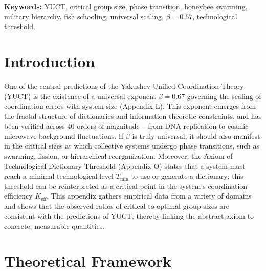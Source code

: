 \documentclass[12pt]{article}
\theoremstyle{remark}
\newcommand{\Keff}{K_{\mathrm{eff}}}
\newcommand{\Tmin}{T_{\min}}
\begin{document}
\begin{titlepage}
\begin{center}
			\vspace{0.3cm}
			\noindent
			\small\textbf{Keywords:} YUCT, critical group size, phase transition, honeybee swarming, military hierarchy, fish schooling, universal scaling, $\beta = 0.67$, technological threshold.
		\end{center}
	\end{titlepage}
	
	\tableofcontents
	\newpage
	
	\section{Introduction}
	\label{sec:intro}
	
	One of the central predictions of the Yakushev Unified Coordination Theory (YUCT) is the existence of a universal exponent $\beta = 0.67$ governing the scaling of coordination errors with system size (Appendix L). This exponent emerges from the fractal structure of dictionaries and information‑theoretic constraints, and has been verified across 40 orders of magnitude – from DNA replication to cosmic microwave background fluctuations. If $\beta$ is truly universal, it should also manifest in the critical sizes at which collective systems undergo phase transitions, such as swarming, fission, or hierarchical reorganization. Moreover, the Axiom of Technological Dictionary Threshold (Appendix O) states that a system must reach a minimal technological level $\Tmin$ to use or generate a dictionary; this threshold can be reinterpreted as a critical point in the system’s coordination efficiency $\Keff$. This appendix gathers empirical data from a variety of domains and shows that the observed ratios of critical to optimal group sizes are consistent with the predictions of YUCT, thereby linking the abstract axiom to concrete, measurable quantities.
	
	\section{Theoretical Framework}
	\label{sec:theory}
	
\end{document}
